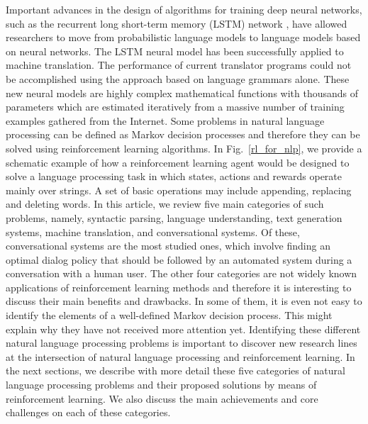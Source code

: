 Important advances in the design of algorithms for training deep neural networks, such as the recurrent long short-term memory (LSTM) network , have allowed researchers to move from probabilistic language models to language models based on neural networks. The LSTM neural model has been successfully applied to machine translation. The performance of current translator programs could not be accomplished using the approach based on language grammars alone. These new neural models are highly complex mathematical functions with thousands of parameters which are estimated iteratively from a massive number of training examples gathered from the Internet.
Some problems in natural language processing can be defined as Markov decision processes and therefore they can be solved using reinforcement learning algorithms. In Fig.\ \ref{rl_for_nlp}, we provide a schematic example of how a reinforcement learning agent would be designed to solve a language processing task in which states, actions and rewards operate mainly over strings. A set of basic operations may include appending, replacing and deleting words.
In this article, we review five main categories of such problems, namely,  syntactic parsing, language understanding, text generation systems, machine translation, and conversational systems. Of these, conversational systems are the most studied ones, which involve finding an optimal dialog policy that should be followed by an automated system during a conversation with a human user. The other four categories are not widely known applications of reinforcement learning methods and therefore it is interesting to discuss their main benefits and drawbacks. In some of them, it is even not easy to identify the elements of a well-defined Markov decision process. This might explain why they have not received more attention yet. Identifying these different natural language processing problems is important to discover new research lines at the intersection of natural language processing and reinforcement learning.
In the next sections, we describe with more detail these five categories of natural language processing problems and their proposed solutions by means of reinforcement learning. We also discuss the main achievements and core challenges on each of these categories.

